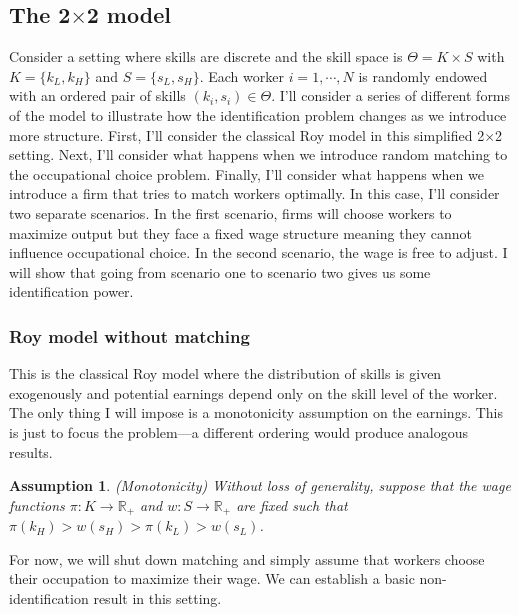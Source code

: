 \documentclass[12 pt]{article}
\newtheorem{assumption}{Assumption} %
\begin{document}
\subsection{The 2$\times$2 model}

Consider a setting where skills are discrete and the skill space is $\Theta = K \times S$ with $K=\{k_L,k_H\}$ and $S=\{s_L,s_H\}$. Each worker $i=1,\cdots,N$ is randomly endowed with an ordered pair of skills $(k_i,s_i)\in\Theta$. I'll consider a series of different forms of the model to illustrate how the identification problem changes as we introduce more structure. First, I'll consider the classical Roy model in this simplified 2$\times$2 setting. Next, I'll consider what happens when we introduce random matching to the occupational choice problem. Finally, I'll consider what happens when we introduce a firm that tries to match workers optimally. In this case, I'll consider two separate scenarios. In the first scenario, firms will choose workers to maximize output but they face a fixed wage structure meaning they cannot influence occupational choice. In the second scenario, the wage is free to adjust. I will show that going from scenario one to scenario two gives us some identification power.

\subsubsection{Roy model without matching}

This is the classical Roy model where the distribution of skills is given exogenously and potential earnings depend only on the skill level of the worker. The only thing I will impose is a monotonicity assumption on the earnings. This is just to focus the problem---a different ordering would produce analogous results.

\begin{assumption}(Monotonicity)
	Without loss of generality, suppose that the wage functions $\pi:K\to\mathbb{R}_+$ and $w:S\to\mathbb{R}_+$ are fixed such that $\pi(k_H) > w(s_H) > \pi(k_L) > w(s_L)$.
	\label{ass:mono}
\end{assumption}

For now, we will shut down matching and simply assume that workers choose their occupation to maximize their wage. We can establish a basic non-identification result in this setting.
\end{document}
